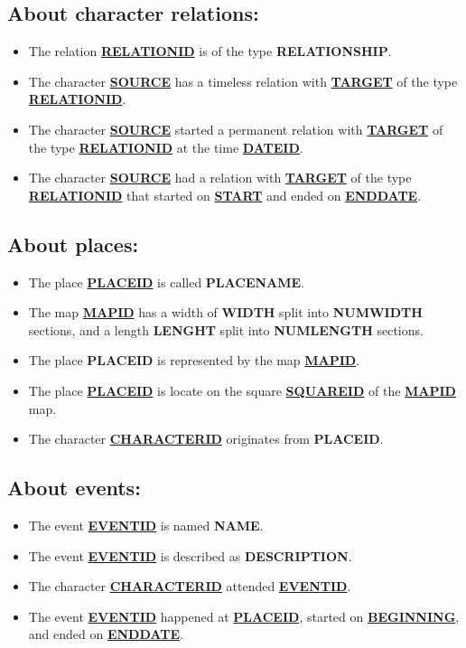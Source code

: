 \documentclass[a4paper ,12pt,french]{article}
\begin{document}
\subsection*{About character relations:}
\begin{itemize}
\item The relation \underline{\textbf{RELATIONID}} is of the type \textbf{RELATIONSHIP}.
\item The character \underline{\textbf{SOURCE}} has a timeless relation with \underline{\textbf{TARGET}} of the type \underline{\textbf{RELATIONID}}.
\item The character \underline{\textbf{SOURCE}} started a permanent relation with \underline{\textbf{TARGET}} of the type \underline{\textbf{RELATIONID}} at the time \underline{\textbf{DATEID}}.
\item The character \underline{\textbf{SOURCE}} had a relation with \underline{\textbf{TARGET}} of the type \underline{\textbf{RELATIONID}} that started on \underline{\textbf{START}} and ended on \underline{\textbf{ENDDATE}}.
\end{itemize}

\subsection*{About places:}
\begin{itemize}
\item The place \underline{\textbf{PLACEID}} is called \textbf{PLACENAME}.
\item The map \underline{\textbf{MAPID}} has a width of \textbf{WIDTH} split into \textbf{NUMWIDTH} sections, and a length \textbf{LENGHT} split into \textbf{NUMLENGTH} sections.
\item The place \textbf{PLACEID} is represented by the map \underline{\textbf{MAPID}}.
\item The place \underline{\textbf{PLACEID}} is locate on the square \underline{\textbf{SQUAREID}} of the \underline{\textbf{MAPID}} map.
\item The character \underline{\textbf{CHARACTERID}} originates from \textbf{PLACEID}.
\end{itemize}

\subsection*{About events:}
\begin{itemize}
\item The event \underline{\textbf{EVENTID}} is named \textbf{NAME}.
\item The event \underline{\textbf{EVENTID}} is described as \textbf{DESCRIPTION}.
\item The character \underline{\textbf{CHARACTERID}} attended \underline{\textbf{EVENTID}}.
\item The event \underline{\textbf{EVENTID}} happened at \underline{\textbf{PLACEID}}, started on \underline{\textbf{BEGINNING}}, and ended on \underline{\textbf{ENDDATE}}.
\end{itemize}
\end{document}
